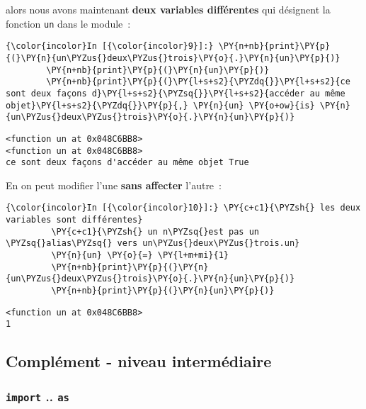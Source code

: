     alors nous avons maintenant \textbf{deux variables différentes} qui
désignent la fonction \texttt{un} dans le module~:

    \begin{Verbatim}[commandchars=\\\{\}]
{\color{incolor}In [{\color{incolor}9}]:} \PY{n+nb}{print}\PY{p}{(}\PY{n}{un\PYZus{}deux\PYZus{}trois}\PY{o}{.}\PY{n}{un}\PY{p}{)}
        \PY{n+nb}{print}\PY{p}{(}\PY{n}{un}\PY{p}{)}
        \PY{n+nb}{print}\PY{p}{(}\PY{l+s+s2}{\PYZdq{}}\PY{l+s+s2}{ce sont deux façons d}\PY{l+s+s2}{\PYZsq{}}\PY{l+s+s2}{accéder au même objet}\PY{l+s+s2}{\PYZdq{}}\PY{p}{,} \PY{n}{un} \PY{o+ow}{is} \PY{n}{un\PYZus{}deux\PYZus{}trois}\PY{o}{.}\PY{n}{un}\PY{p}{)}
\end{Verbatim}


    \begin{Verbatim}[commandchars=\\\{\}]
<function un at 0x048C6BB8>
<function un at 0x048C6BB8>
ce sont deux façons d'accéder au même objet True

    \end{Verbatim}

    En on peut modifier l'une \textbf{sans affecter} l'autre~:

    \begin{Verbatim}[commandchars=\\\{\}]
{\color{incolor}In [{\color{incolor}10}]:} \PY{c+c1}{\PYZsh{} les deux variables sont différentes}
         \PY{c+c1}{\PYZsh{} un n\PYZsq{}est pas un \PYZsq{}alias\PYZsq{} vers un\PYZus{}deux\PYZus{}trois.un}
         \PY{n}{un} \PY{o}{=} \PY{l+m+mi}{1}
         \PY{n+nb}{print}\PY{p}{(}\PY{n}{un\PYZus{}deux\PYZus{}trois}\PY{o}{.}\PY{n}{un}\PY{p}{)}
         \PY{n+nb}{print}\PY{p}{(}\PY{n}{un}\PY{p}{)}
\end{Verbatim}


    \begin{Verbatim}[commandchars=\\\{\}]
<function un at 0x048C6BB8>
1

    \end{Verbatim}

    \hypertarget{compluxe9ment---niveau-intermuxe9diaire}{%
\subsection{Complément - niveau
intermédiaire}\label{compluxe9ment---niveau-intermuxe9diaire}}

    \hypertarget{import-..-as}{%
\subsubsection{\texorpdfstring{\texttt{import} ..
\texttt{as}}{import .. as}}\label{import-..-as}}

